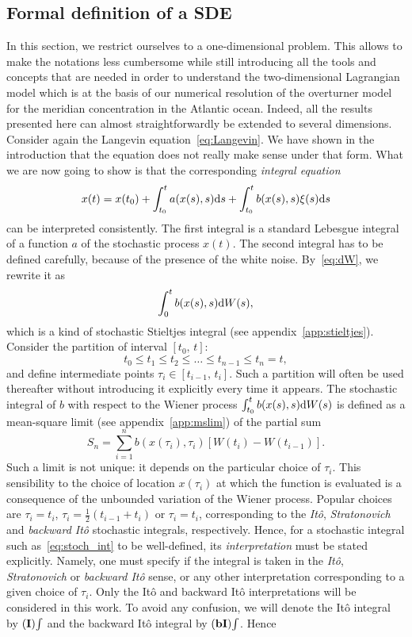\subsection{Formal definition of a SDE}
In this section, we restrict ourselves to a one-dimensional problem. This allows to make the notations less cumbersome while still introducing all the tools and concepts that are needed in order to understand the two-dimensional Lagrangian model which is at the basis of our numerical resolution of the overturner model for the meridian concentration in the Atlantic ocean. Indeed, all the results presented here can almost straightforwardly be extended to several dimensions. Consider again the Langevin equation~\eqref{eq:Langevin}. We have shown in the introduction that the equation does not really make sense under that form. What we are now going to show is that the corresponding \textit{integral equation} 
\begin{equation} \label{eq:SDEint_xsi}
	x(t) = x(t_0) + \int_{t_0}^t a(x(s),s) \rm ds + \int_{t_0}^t b(x(s),s) \xi(s) \rm ds
\end{equation}
can be interpreted consistently. The first integral is a standard Lebesgue integral of a function $a$ of the stochastic process $x(t)$. The second integral has to be defined carefully, because of the presence of the white noise. By~\eqref{eq:dW}, we rewrite it as
\begin{equation} \label{eq:stoch_int}
	\int_0^t b(x(s),s) \rm dW(s),
\end{equation}
which is a kind of stochastic Stieltjes integral (see appendix~\ref{app:stieltjes}). Consider the partition of interval $[t_0,\,t]$:
\begin{equation}
	t_0 \le t_1 \le t_2 \le \dots \le t_{n-1} \le t_n = t,
\end{equation}
and define intermediate points $\tau_i \in [t_{i-1},\, t_i]$. Such a partition will often be used thereafter without introducing it explicitly every time it appears. The stochastic integral of $b$ with respect to the Wiener process $\int_{t_0}^t b(x(s),s) \rm dW(s)$ is defined as a mean-square limit (see appendix~\ref{app:mslim}) of the partial sum
\begin{equation}
	S_n = \sum_{i=1}^n b(x(\tau_i),\tau_i) [W(t_i)-W(t_{i-1})].
\end{equation}
Such a limit is not unique: it depends on the particular choice of $\tau_i$. This sensibility to the choice of location $x(\tau_i)$ at which the function is evaluated is a consequence of the unbounded variation of the Wiener process. Popular choices are $\tau_i = t_i$, $\tau_i = \frac{1}{2}(t_{i-1}+t_i)$ or $\tau_i = t_i$, corresponding to the \textit{Itô}, \textit{Stratonovich} and \textit{backward Itô} stochastic integrals, respectively. Hence, for a stochastic integral such as~\eqref{eq:stoch_int} to be well-defined, its \textit{interpretation} must be stated explicitly. Namely, one must specify if the integral is taken in the \textit{Itô}, \textit{Stratonovich} or \textit{backward Itô} sense, or any other interpretation corresponding to a given choice of $\tau_i$. Only the Itô and backward Itô interpretations will be considered in this work. To avoid any confusion, we will denote the Itô integral by $\I\int$ and the backward Itô integral by $\bI\int$. Hence
